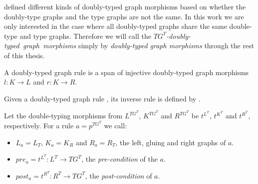 \begin{remark} \cite{Ribeiro1996} defined different kinds of doubly-typed graph morphisms based on whether the doubly-type graphs and the type graphs are not the same. In this work we are only interested in the case where all doubly-typed graphs share the same double-type and type graphs. Therefore we will call the \mbox{\emph{$TG^T$-doubly-typed graph morphisms}} simply by \emph{doubly-typed graph morphisms} through the rest of this thesis.

\end{remark}


\begin{definition} A doubly-typed graph rule \doublyTypedRule{} is a span of injective doubly-typed graph morphisms $l : K \rightarrow L$ and $r : K \rightarrow R$.


  Given a doubly-typed graph rule \doublyTypedRule{}, its inverse rule is defined by \inverseDoublyTypedRule{}.

  Let the double-typing morphisms from $L^{TG^T}$, $K^{TG^T}$ and $R^{TG^T}$ be $t^{L^T}$, $t^{K^T}$ and $t^{R^T}$, respectively. For a rule $a = p^{TG^T}$ we call:

  \begin{itemize}
    \item $L_a = L_T$, $K_a = K_R$ and $R_a = R_T$, the left, gluing and right graphs of $a$.
    \item $pre_a = t^{L^T} : L^T \rightarrow TG^T$, the \emph{pre-condition} of the $a$.
    \item $post_a = t^{R^T} : R^T \rightarrow TG^T$, the \emph{post-condition} of $a$.
  \end{itemize}

\end{definition}

